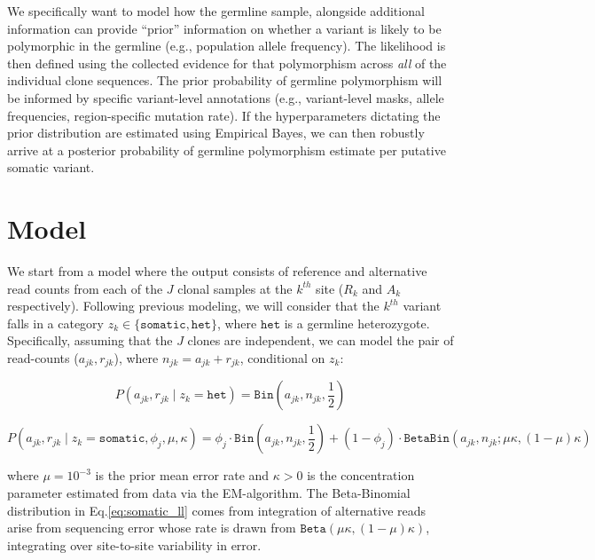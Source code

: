 \documentclass{article}
\begin{document}
We specifically want to model how the germline sample, alongside additional information can provide ``prior'' information on whether a variant is likely to be polymorphic in the germline (e.g., population allele frequency). The likelihood is then defined using the collected evidence for that polymorphism across \textit{all} of the individual clone sequences. The prior probability of germline polymorphism will be informed by specific variant-level annotations (e.g., variant-level masks, allele frequencies, region-specific mutation rate). If the hyperparameters dictating the prior distribution are estimated using Empirical Bayes, we can then robustly arrive at a posterior probability of germline polymorphism estimate per putative somatic variant.

\section*{Model}

We start from a model where the output consists of reference and alternative read counts from each of the $J$ clonal samples at the $k^{th}$ site ($R_k$ and $A_k$ respectively). Following previous modeling, we will consider that the $k^{th}$ variant falls in a category $z_k\in \{\texttt{somatic}, \texttt{het}\}$, where $\texttt{het}$ is a germline heterozygote. Specifically, assuming that the $J$ clones are independent, we can model the pair of read-counts ($a_{jk}, r_{jk}$), where $n_{jk} = a_{jk} + r_{jk}$, conditional on $z_k$:


\begin{equation}
P(a_{jk}, r_{jk} \mid z_k = \texttt{het}) = \texttt{Bin}(a_{jk},n_{jk},\frac{1}{2})
\label{eq:germline_ll}
\end{equation}


\begin{equation}
P(a_{jk}, r_{jk} \mid z_k = \texttt{somatic},\phi_j,\mu,\kappa )
= \phi_j \cdot \texttt{Bin}\left(a_{jk},n_{jk},\frac{1}{2}\right) + (1 - \phi_j)\cdot \texttt{BetaBin}(a_{jk},n_{jk}; \mu\kappa, (1-\mu)\kappa)
\label{eq:somatic_ll}
\end{equation}

where $\mu = 10^{-3}$ is the prior mean error rate and $\kappa > 0$ is
the concentration parameter estimated from data via the EM-algorithm. The Beta-Binomial distribution in Eq.\ref{eq:somatic_ll} comes from integration of alternative reads arise from sequencing error whose rate is drawn from $\texttt{Beta}(\mu\kappa,(1{-}\mu)\kappa)$, integrating over site-to-site variability in error.
\end{document}
